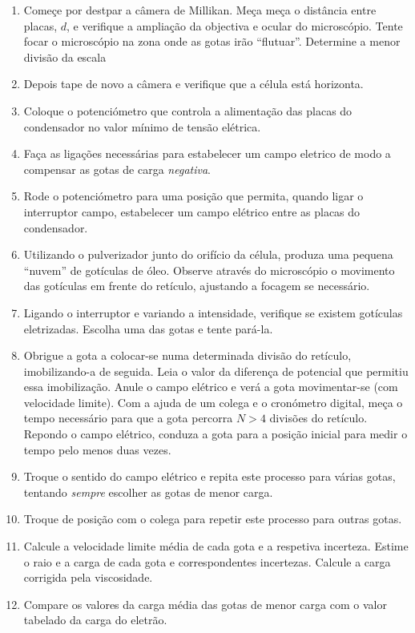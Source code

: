 \documentclass[a4paper,twoside,12pt]{article}      %
\begin{document}
\begin{enumerate}
\item   Começe por destpar a câmera de Millikan. Meça meça o distância entre placas,  $d$, e verifique a ampliação da objectiva e ocular do microscópio. Tente focar o microscópio na zona onde as gotas irão ``flutuar''. Determine a menor divisão da escala
\item Depois tape de novo a  câmera e verifique que a célula está horizonta.  

\item Coloque o potenciómetro que controla a alimentação das placas do condensador no valor mínimo de tensão elétrica. 

\item Faça as ligações necessárias para estabelecer um campo eletrico de modo a compensar as gotas de carga \emph{negativa}.
\item 
Rode o potenciómetro para uma posição que permita, quando ligar o interruptor campo, estabelecer um campo elétrico entre as placas do condensador. 

\item     Utilizando o pulverizador junto do orifício da célula, produza uma pequena ``nuvem'' %
de gotículas de óleo. Observe através do microscópio o movimento das gotículas em 
frente do retículo, ajustando a focagem se necessário.

\item     Ligando o interruptor e variando a intensidade, verifique se existem gotículas eletrizadas. Escolha uma das gotas e tente pará-la.

 \item Obrigue a gota a colocar-se numa determinada divisão do retículo, imobilizando-a de seguida. 
Leia o valor da diferença de potencial que permitiu essa imobilização. Anule o 
campo elétrico  e verá a gota movimentar-se (com velocidade limite). Com a ajuda de um colega e o 
cronómetro digital, meça o tempo necessário para que a gota percorra  $N>4$ divisões
do retículo. Repondo o campo elétrico, conduza a gota para a posição inicial para  medir o tempo pelo menos duas vezes. 

\item Troque o sentido do campo elétrico e   repita este processo para várias gotas, tentando \emph{sempre} escolher  as gotas de menor carga.

\item Troque de posição com o colega para repetir este processo para outras  gotas.

\item   Calcule a velocidade limite média de cada gota e a respetiva incerteza. Estime o raio e 
a carga de cada gota e correspondentes incertezas. Calcule a carga corrigida pela viscosidade.

\item   Compare os valores da carga média das gotas de menor carga  com o valor tabelado da carga do eletrão. 
\end{enumerate}



\end{document}
